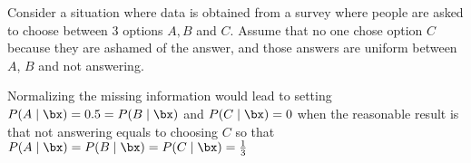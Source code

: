 \begin{exampleth}
  Consider a situation where data is obtained from a survey where people are asked to choose between 3 options \(A, B\) and \(C\). Assume that no one chose option \(C\) because they are ashamed of the answer, and those answers are uniform between \(A\), \(B\) and not answering.

  Normalizing the missing information would lead to setting \(P(A \mid \bx) = 0.5 = P(B \mid \bx)\) and \(P(C \mid \bx) = 0\) when the reasonable result is that not answering equals to choosing \(C\) so that \(P(A \mid \bx) = P(B \mid \bx) = P(C \mid \bx) = \frac{1}{3}\)
\end{exampleth}
